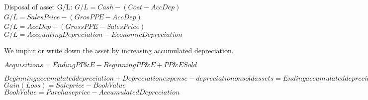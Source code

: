 Disposal of asset G/L: $G/L = Cash-(Cost-AccDep)$ \
 $G/L = SalesPrice-(GrosPPE-AccDep)$ \
 $G/L = AccDep + (GrossPPE-SalesPrice)$ \
 $G/L = AccountingDepreciation - EconomicDepreciation$


We impair or write down the asset by increasing accumulated depreciation.

$Acquisitions = Ending PP\&E - Beginning PP\&E + PP\&E Sold$

$Beginning accumulated depreciation + Depreciation expense - depreciation on sold assets = Ending accumulated depreciation$ \\

$Gain (Loss) = Sale price - Book Value$ \\
$Book Value = Purchase price - Accumulated Depreciation$
